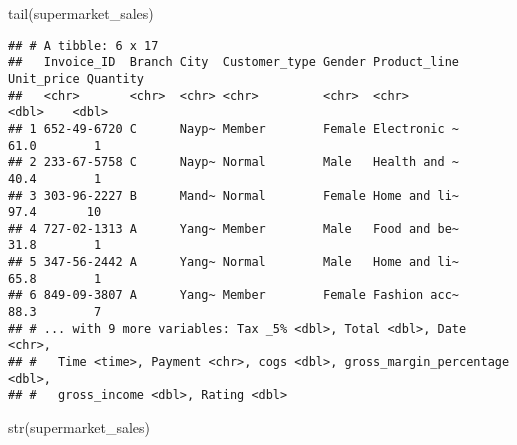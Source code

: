 \documentclass[
]{article}
\newenvironment{Shaded}{\begin{snugshade}}{\end{snugshade}}
\newcommand{\FunctionTok}[1]{\textcolor[rgb]{0.00,0.00,0.00}{#1}}
\newcommand{\NormalTok}[1]{#1}
\begin{document}
\begin{Shaded}
\begin{Highlighting}[]
\FunctionTok{tail}\NormalTok{(supermarket\_sales)}
\end{Highlighting}
\end{Shaded}

\begin{verbatim}
## # A tibble: 6 x 17
##   Invoice_ID  Branch City  Customer_type Gender Product_line Unit_price Quantity
##   <chr>       <chr>  <chr> <chr>         <chr>  <chr>             <dbl>    <dbl>
## 1 652-49-6720 C      Nayp~ Member        Female Electronic ~       61.0        1
## 2 233-67-5758 C      Nayp~ Normal        Male   Health and ~       40.4        1
## 3 303-96-2227 B      Mand~ Normal        Female Home and li~       97.4       10
## 4 727-02-1313 A      Yang~ Member        Male   Food and be~       31.8        1
## 5 347-56-2442 A      Yang~ Normal        Male   Home and li~       65.8        1
## 6 849-09-3807 A      Yang~ Member        Female Fashion acc~       88.3        7
## # ... with 9 more variables: Tax _5% <dbl>, Total <dbl>, Date <chr>,
## #   Time <time>, Payment <chr>, cogs <dbl>, gross_margin_percentage <dbl>,
## #   gross_income <dbl>, Rating <dbl>
\end{verbatim}

\begin{Shaded}
\begin{Highlighting}[]
\FunctionTok{str}\NormalTok{(supermarket\_sales)}
\end{Highlighting}
\end{Shaded}
\end{document}
